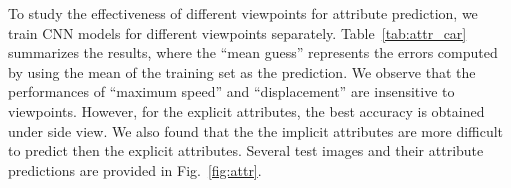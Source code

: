 \documentclass[10pt,twocolumn,letterpaper]{article}
\begin{document}
To study the effectiveness of different viewpoints for attribute prediction, we train CNN models for different viewpoints separately.
%
Table~\ref{tab:attr_car} summarizes the results, where the ``mean guess'' represents the errors computed by using the mean of the training set as the prediction.
%
We observe that the performances of ``maximum speed'' and ``displacement'' are insensitive to viewpoints. However, for the explicit attributes, the best accuracy is obtained under side view.
%
%
We also found that the the implicit attributes are more difficult to predict then the explicit attributes. Several test images and their attribute predictions are provided in Fig.~\ref{fig:attr}. %



\end{document}
